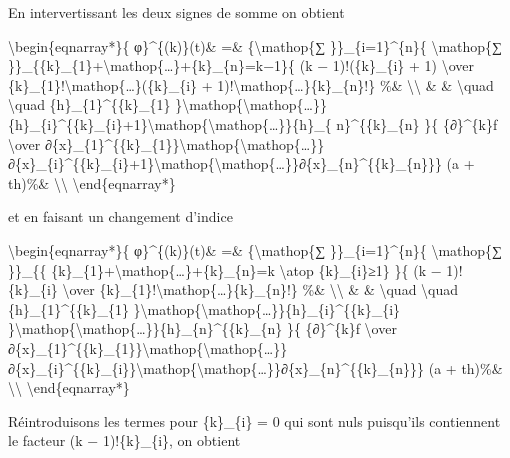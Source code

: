 En intervertissant les deux signes de somme on obtient

\textbackslash{}begin\{eqnarray*\}\{ φ\}\^{}\{(k)\}(t)\& =\&
\{\textbackslash{}mathop\{∑ \}\}\_\{i=1\}\^{}\{n\}\{
\textbackslash{}mathop\{∑
\}\}\_\{\{k\}\_\{1\}+\textbackslash{}mathop\{\ldots{}\}+\{k\}\_\{n\}=k−1\}\{
(k − 1)!(\{k\}\_\{i\} + 1) \textbackslash{}over
\{k\}\_\{1\}!\textbackslash{}mathop\{\ldots{}\}(\{k\}\_\{i\} +
1)!\textbackslash{}mathop\{\ldots{}\}\{k\}\_\{n\}!\} \%\&
\textbackslash{}\textbackslash{} \& \& \textbackslash{}quad
\textbackslash{}quad \{h\}\_\{1\}\^{}\{\{k\}\_\{1\}
\}\textbackslash{}mathop\{\textbackslash{}mathop\{\ldots{}\}\}\{h\}\_\{i\}\^{}\{\{k\}\_\{i\}+1\}\textbackslash{}mathop\{\textbackslash{}mathop\{\ldots{}\}\}\{h\}\_\{
n\}\^{}\{\{k\}\_\{n\} \}\{ \{∂\}\^{}\{k\}f \textbackslash{}over
∂\{x\}\_\{1\}\^{}\{\{k\}\_\{1\}\}\textbackslash{}mathop\{\textbackslash{}mathop\{\ldots{}\}\}∂\{x\}\_\{i\}\^{}\{\{k\}\_\{i\}+1\}\textbackslash{}mathop\{\textbackslash{}mathop\{\ldots{}\}\}∂\{x\}\_\{n\}\^{}\{\{k\}\_\{n\}\}\}
(a + th)\%\& \textbackslash{}\textbackslash{}
\textbackslash{}end\{eqnarray*\}

et en faisant un changement d'indice

\textbackslash{}begin\{eqnarray*\}\{ φ\}\^{}\{(k)\}(t)\& =\&
\{\textbackslash{}mathop\{∑ \}\}\_\{i=1\}\^{}\{n\}\{
\textbackslash{}mathop\{∑ \}\}\_\{\{
\{k\}\_\{1\}+\textbackslash{}mathop\{\ldots{}\}+\{k\}\_\{n\}=k
\textbackslash{}atop \{k\}\_\{i\}≥1\} \}\{ (k − 1)!\{k\}\_\{i\}
\textbackslash{}over
\{k\}\_\{1\}!\textbackslash{}mathop\{\ldots{}\}\{k\}\_\{n\}!\} \%\&
\textbackslash{}\textbackslash{} \& \& \textbackslash{}quad
\textbackslash{}quad \{h\}\_\{1\}\^{}\{\{k\}\_\{1\}
\}\textbackslash{}mathop\{\textbackslash{}mathop\{\ldots{}\}\}\{h\}\_\{i\}\^{}\{\{k\}\_\{i\}
\}\textbackslash{}mathop\{\textbackslash{}mathop\{\ldots{}\}\}\{h\}\_\{n\}\^{}\{\{k\}\_\{n\}
\}\{ \{∂\}\^{}\{k\}f \textbackslash{}over
∂\{x\}\_\{1\}\^{}\{\{k\}\_\{1\}\}\textbackslash{}mathop\{\textbackslash{}mathop\{\ldots{}\}\}∂\{x\}\_\{i\}\^{}\{\{k\}\_\{i\}\}\textbackslash{}mathop\{\textbackslash{}mathop\{\ldots{}\}\}∂\{x\}\_\{n\}\^{}\{\{k\}\_\{n\}\}\}
(a + th)\%\& \textbackslash{}\textbackslash{}
\textbackslash{}end\{eqnarray*\}

Réintroduisons les termes pour \{k\}\_\{i\} = 0 qui sont nuls puisqu'ils
contiennent le facteur (k − 1)!\{k\}\_\{i\}, on obtient

